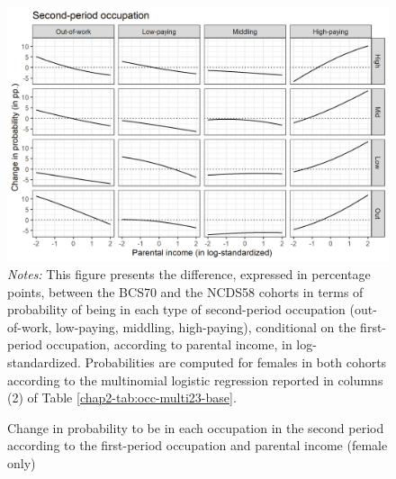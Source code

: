 \begin{figure}[!htb]
    \centering
    \caption{Change in probability to be in each occupation in the second period according to the first-period occupation and parental income (female only)}
    \label{chap2-fig:occ-multi3-pinc-female}
    \includegraphics[width=\linewidth]{chap2/graphic/occ-multi3-pinc-female.png}
    \vspace{-3em}
    \justify\singlespacing\footnotesize{\textit{Notes:} This figure presents the difference, expressed in percentage points, between the BCS70 and the NCDS58 cohorts in terms of probability of being in each type of second-period occupation (out-of-work, low-paying, middling, high-paying), conditional on the first-period occupation, according to parental income, in log-standardized.
    Probabilities are computed for females in both cohorts according to the multinomial logistic regression reported in columns (2) of Table \ref{chap2-tab:occ-multi23-base}.}
\end{figure}

